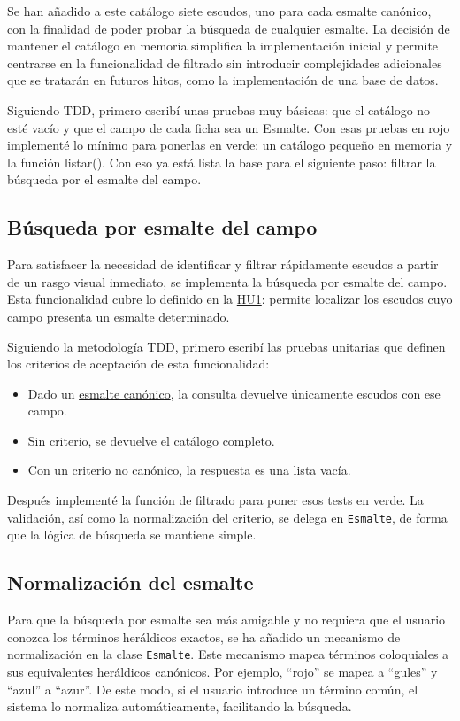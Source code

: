 Se han añadido a este catálogo siete escudos, uno para cada esmalte canónico, con la finalidad de
poder probar la búsqueda de cualquier esmalte. La decisión de mantener el catálogo en memoria
simplifica la implementación inicial y permite centrarse en la funcionalidad de filtrado sin
introducir complejidades adicionales que se tratarán en futuros hitos, como la implementación
de una base de datos.

Siguiendo TDD, primero escribí unas pruebas muy básicas: que el catálogo no esté vacío y que el 
campo de cada ficha sea un Esmalte. Con esas pruebas en rojo implementé lo mínimo para ponerlas en
verde: un catálogo pequeño en memoria y la función listar(). Con eso ya está lista la base para el
siguiente paso: filtrar la búsqueda por el esmalte del campo.

\subsection{Búsqueda por esmalte del campo}
Para satisfacer la necesidad de identificar y filtrar rápidamente escudos a partir de un rasgo visual
inmediato, se implementa la búsqueda por esmalte del campo. Esta funcionalidad cubre lo definido en la
\hyperref[sec:hu1]{HU1}: permite localizar los escudos cuyo campo presenta un esmalte determinado.

Siguiendo la metodología TDD, primero escribí las pruebas unitarias que definen los criterios de
aceptación de esta funcionalidad:

\begin{itemize}
    \item Dado un \hyperref[fig:esmaltes-canonicos]{esmalte canónico}, la consulta devuelve únicamente escudos con ese campo.
    \item Sin criterio, se devuelve el catálogo completo.
    \item Con un criterio no canónico, la respuesta es una lista vacía.
\end{itemize}

Después implementé la función de filtrado para poner esos tests en verde. La validación, así como 
la normalización del criterio, se delega en \texttt{Esmalte}, de forma que la lógica de
búsqueda se mantiene simple.

\subsection{Normalización del esmalte}
Para que la búsqueda por esmalte sea más amigable y no requiera que el usuario conozca los términos
heráldicos exactos, se ha añadido un mecanismo de normalización en la clase \texttt{Esmalte}. 
Este mecanismo mapea términos coloquiales a sus equivalentes heráldicos canónicos. Por ejemplo,
``rojo'' se mapea a ``gules'' y ``azul'' a ``azur''. De este modo, si el usuario introduce un término común,
el sistema lo normaliza automáticamente, facilitando la búsqueda.